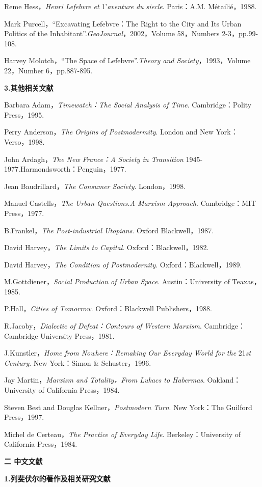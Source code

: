 \documentclass[UTF8, fontset = sourcesans, a4paper, oneside, zihao =
-4, scheme=chinese, no-math, space=true]{ctexbook}
\begin{document}
Reme Hess，\emph{Henri Lefebvre et} 1'\emph{aventure du siecle}.
Paris：A.M. Métailié，1988.

Mark Purcell，``Excavating Lefebvre：The Right to the City and Its Urban
Politics of the Inhabitant''.\emph{GeoJournal}，2002，Volume 58，Numbers
2-3，pp.99-108.

Harvey Molotch，``The Space of Lefebvre''.\emph{Theory and
Society}，1993，Volume 22，Number 6，pp.887-895.

\textbf{3.其他相关文献}

Barbara Adam，\emph{Timewatch：The Social Analysis of Time}.
Cambridge：Polity Press，1995.

Perry Anderson，\emph{The Origins of Postmodermity}. London and New
York：Verso，1998.

John Ardagh，\emph{The New France：A Society in Transition}
1945-1977.Harmondsworth：Penguin，1977.

Jean Baudrillard，\emph{The Consumer Society}. London，1998.

Manuel Castells，\emph{The Urban Questions.A Marxism Approach}.
Cambridge：MIT Press，1977.

B.Frankel，\emph{The Post-industrial Utopians}. Oxford Blackwell，1987.

David Harvey，\emph{The Limits to Capital}. Oxford：Blackwell，1982.

David Harvey，\emph{The Condition of Postmodernity}.
Oxford：Blackwell，1989.

M.Gottdiener，\emph{Social Production of Urban Space}.
Austin：University of Teaxas，1985.

P.Hall，\emph{Cities of Tomorrow}. Oxford：Blackwell Publishers，1988.

R.Jacoby，\emph{Dialectic of Defeat：Contours of Western Marxism}.
Cambridge：Cambridge University Press，1981.

J.Kunstler，\emph{Home from Nowhere：Remaking Our Everyday World for
the} 21\emph{st Century}. New York：Simon \& Schuster，1996.

Jay Martin，\emph{Marxism and Totality，From Lukacs to Habermas}.
Oakland：University of California Press，1984.

Steven Best and Douglas Kellner，\emph{Postmodern Turn}. New York：The
Guilford Press，1997.

Michel de Certeau，\emph{The Practice of Everyday Life}.
Berkeley：University of California Press，1984.

\textbf{二 中文文献}

\textbf{1.列斐伏尔的著作及相关研究文献}
\end{document}
